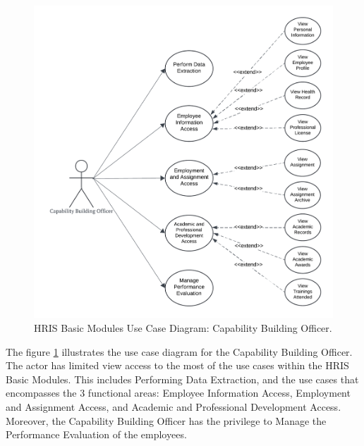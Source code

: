     \begin{figure}[H]
        \centering
        \includegraphics[width=0.9\linewidth]{figures/images/diagrams/usecase/use-case-basic-7.png}
        \caption{HRIS Basic Modules Use Case Diagram: Capability Building Officer.}
        \label{fig:use-case-basic-7}
    \end{figure}

    The figure \ref{fig:use-case-basic-7} illustrates the use case diagram for the Capability Building Officer. The actor has limited view access to the most of the use cases within the HRIS Basic Modules. This includes Performing Data Extraction, and the use cases that  encompasses the 3 functional areas: Employee Information Access, Employment and Assignment Access, and Academic and Professional Development Access. Moreover, the Capability Building Officer has the privilege to Manage the Performance Evaluation of the employees.

